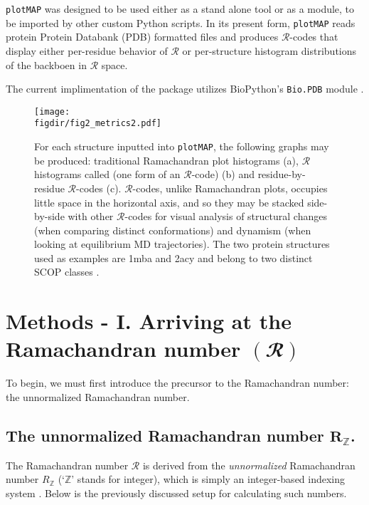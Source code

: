 \documentclass[fleqn,10pt]{wlpeerj} %
\newcommand{\pname}{\texttt{plotMAP}\xspace}
\newcommand{\code}[1]{\texttt{#1}\xspace}
\newcommand{\rr}{$\mathcal{R}$\xspace}
\newcommand{\figdir}{./figures}
\begin{document}
\pname was designed to be used either as a stand alone tool or as a module, to be imported by other custom Python scripts. In its present form, \pname reads protein Protein Databank (PDB) formatted files \citep{Berman2000} and produces $\mathcal{R}$-codes that display either per-residue behavior of \rr or per-structure histogram distributions of the backboen in $\mathcal{R}$ space. 

The current implimentation of the package utilizes BioPython's \code{Bio.PDB} module \citep{Cock2009}. 


\begin{figure}
\centering
\texttt{[image: \\figdir/fig2\_metrics2.pdf]}
\caption{For each structure inputted into \pname, the following graphs may be produced: traditional Ramachandran plot histograms (a), \rr histograms called (one form of an \rr-code) (b) and residue-by-residue \rr-codes (c). \rr-codes, unlike Ramachandran plots, occupies little space in the horizontal axis, and so they may be stacked side-by-side with other \rr-codes for visual analysis of structural changes (when comparing distinct conformations) and dynamism (when looking at equilibrium MD trajectories). The two protein structures used as examples are 1mba and 2acy and belong to two distinct SCOP classes \citep{Fox2014}.
\label{fig:metrics}}
\end{figure}

\section*{Methods - I. Arriving at the Ramachandran number $\bm{(\mathbfcal{R})}$}

To begin, we must first introduce the precursor to the Ramachandran number: the unnormalized Ramachandran number.

\subsection*{The unnormalized Ramachandran number $\bm{R_\mathbb{Z}}$.}
The Ramachandran number $\mathcal{R}$ is derived from the {\it unnormalized} Ramachandran number $R_\mathbb{Z}$ (`$\mathbb{Z}$' stands for integer), which is simply an integer-based indexing system \citep{MannigeKunduWhitelam2016}. Below is the previously discussed setup for calculating such numbers.
\end{document}

